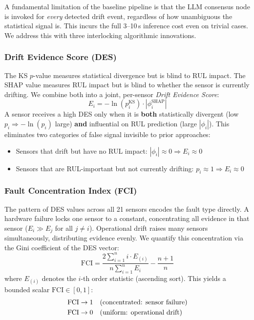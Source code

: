 \documentclass[conference, 10pt]{IEEEtran}
\begin{document}
A fundamental limitation of the baseline pipeline is that the LLM consensus node is invoked for \emph{every} detected drift event, regardless of how unambiguous the statistical signal is. This incurs the full 3--10\,s inference cost even on trivial cases. We address this with three interlocking algorithmic innovations.

\subsubsection{Drift Evidence Score (DES)}
The KS $p$-value measures statistical divergence but is blind to RUL impact. The SHAP value measures RUL impact but is blind to whether the sensor is currently drifting. We combine both into a joint, per-sensor \emph{Drift Evidence Score}:
\begin{equation}
\label{eq:des}
E_i = -\ln(p_i^{\text{KS}}) \cdot |\phi_i^{\text{SHAP}}|
\end{equation}
A sensor receives a high DES only when it is \textbf{both} statistically divergent (low $p_i \Rightarrow -\ln(p_i)$ large) \textbf{and} influential on RUL prediction (large $|\phi_i|$). This eliminates two categories of false signal invisible to prior approaches:
\begin{itemize}
    \item Sensors that drift but have no RUL impact: $|\phi_i| \approx 0 \Rightarrow E_i \approx 0$
    \item Sensors that are RUL-important but not currently drifting: $p_i \approx 1 \Rightarrow E_i \approx 0$
\end{itemize}

\subsubsection{Fault Concentration Index (FCI)}
The pattern of DES values across all 21 sensors encodes the fault type directly. A hardware failure locks one sensor to a constant, concentrating all evidence in that sensor ($E_i \gg E_j$ for all $j \neq i$). Operational drift raises many sensors simultaneously, distributing evidence evenly. We quantify this concentration via the Gini coefficient of the DES vector:
\begin{equation}
\label{eq:fci}
\text{FCI} = \frac{2 \sum_{i=1}^{n} i \cdot E_{(i)}}{n \sum_{i=1}^{n} E_i} - \frac{n+1}{n}
\end{equation}
where $E_{(i)}$ denotes the $i$-th order statistic (ascending sort). This yields a bounded scalar $\text{FCI} \in [0, 1]$:
\begin{align}
\text{FCI} &\rightarrow 1 \quad \text{(concentrated: sensor failure)} \notag \\
\text{FCI} &\rightarrow 0 \quad \text{(uniform: operational drift)} \notag
\end{align}
\end{document}
